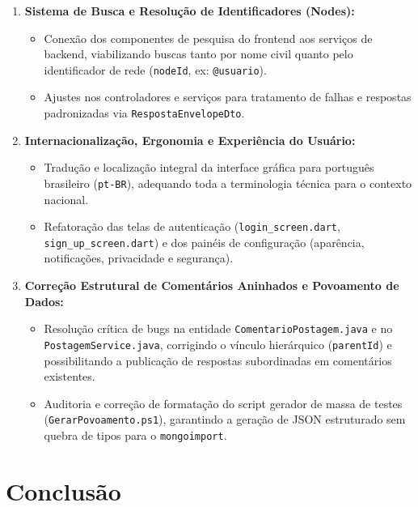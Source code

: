 \documentclass[12pt,a4paper]{report}
\begin{document}
\begin{enumerate}
\begin{itemize}
    \end{itemize}
    \item \textbf{Sistema de Busca e Resolução de Identificadores (Nodes):}
    \begin{itemize}
        \item Conexão dos componentes de pesquisa do frontend aos serviços de backend, viabilizando buscas tanto por nome civil quanto pelo identificador de rede (\texttt{nodeId}, ex: \texttt{@usuario}).
        \item Ajustes nos controladores e serviços para tratamento de falhas e respostas padronizadas via \texttt{RespostaEnvelopeDto}.
    \end{itemize}
    \item \textbf{Internacionalização, Ergonomia e Experiência do Usuário:}
    \begin{itemize}
        \item Tradução e localização integral da interface gráfica para português brasileiro (\texttt{pt-BR}), adequando toda a terminologia técnica para o contexto nacional.
        \item Refatoração das telas de autenticação (\texttt{login\_screen.dart}, \texttt{sign\_up\_screen.dart}) e dos painéis de configuração (aparência, notificações, privacidade e segurança).
    \end{itemize}
    \item \textbf{Correção Estrutural de Comentários Aninhados e Povoamento de Dados:}
    \begin{itemize}
        \item Resolução crítica de bugs na entidade \texttt{ComentarioPostagem.java} e no \texttt{PostagemService.java}, corrigindo o vínculo hierárquico (\texttt{parentId}) e possibilitando a publicação de respostas subordinadas em comentários existentes.
        \item Auditoria e correção de formatação do script gerador de massa de testes (\texttt{GerarPovoamento.ps1}), garantindo a geração de JSON estruturado sem quebra de tipos para o \texttt{mongoimport}.
    \end{itemize}
\end{enumerate}

\chapter{Conclusão}
\end{document}
